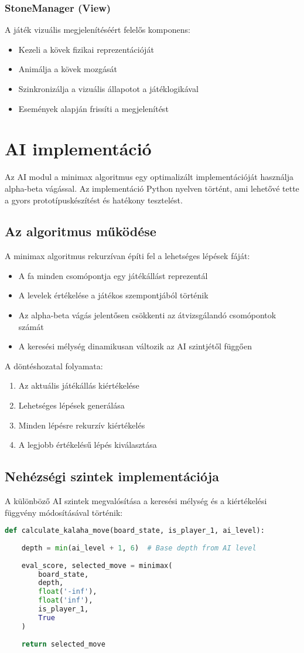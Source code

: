 \subsubsection{StoneManager (View)}
A játék vizuális megjelenítéséért felelős komponens:
\begin{itemize}
	\item Kezeli a kövek fizikai reprezentációját
	\item Animálja a kövek mozgását
	\item Szinkronizálja a vizuális állapotot a játéklogikával
	\item Események alapján frissíti a megjelenítést
\end{itemize}
\section{AI implementáció}
Az AI modul a minimax algoritmus egy optimalizált implementációját használja alpha-beta vágással. Az implementáció Python nyelven történt, ami lehetővé tette a gyors prototípuskészítést és hatékony tesztelést.
\subsection{Az algoritmus működése}
A minimax algoritmus rekurzívan építi fel a lehetséges lépések fáját:
\begin{itemize}
	\item A fa minden csomópontja egy játékállást reprezentál
	\item A levelek értékelése a játékos szempontjából történik
	\item Az alpha-beta vágás jelentősen csökkenti az átvizsgálandó csomópontok számát
	\item A keresési mélység dinamikusan változik az AI szintjétől függően
\end{itemize}
A döntéshozatal folyamata:
\begin{enumerate}
	\item Az aktuális játékállás kiértékelése
	\item Lehetséges lépések generálása
	\item Minden lépésre rekurzív kiértékelés
	\item A legjobb értékelésű lépés kiválasztása
\end{enumerate}
\subsection{Nehézségi szintek implementációja}
A különböző AI szintek megvalósítása a keresési mélység és a kiértékelési függvény módosításával történik:
\begin{lstlisting}[language=Python]
	def calculate_kalaha_move(board_state, is_player_1, ai_level):
	
	depth = min(ai_level + 1, 6)  # Base depth from AI level
	
	eval_score, selected_move = minimax(
		board_state, 
		depth,
		float('-inf'),
		float('inf'),
		is_player_1,
		True
	)
	
	return selected_move
\end{lstlisting}

